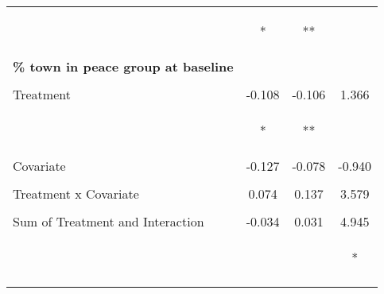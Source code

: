 \begin{tabular}{lccc}
 & \begin{footnotesize}[0.124]*\end{footnotesize} & \begin{footnotesize}[0.108]**\end{footnotesize} & \begin{footnotesize}[4.160]\end{footnotesize}\\
\noalign{\smallskip}\textbf{\% town in peace group at baseline} &  &  & \\
 & \begin{footnotesize}\end{footnotesize} & \begin{footnotesize}\end{footnotesize} & \begin{footnotesize}\end{footnotesize}\\
\noalign{\smallskip}Treatment & -0.108 & -0.106 & 1.366\\
 & \begin{footnotesize}[0.061]*\end{footnotesize} & \begin{footnotesize}[0.049]**\end{footnotesize} & \begin{footnotesize}[1.988]\end{footnotesize}\\
\noalign{\smallskip}Covariate & -0.127 & -0.078 & -0.940\\
 & \begin{footnotesize}[0.110]\end{footnotesize} & \begin{footnotesize}[0.085]\end{footnotesize} & \begin{footnotesize}[3.518]\end{footnotesize}\\
\noalign{\smallskip}Treatment x Covariate & 0.074 & 0.137 & 3.579\\
 & \begin{footnotesize}[0.142]\end{footnotesize} & \begin{footnotesize}[0.112]\end{footnotesize} & \begin{footnotesize}[4.514]\end{footnotesize}\\
\noalign{\smallskip}Sum of Treatment and Interaction & -0.034 & 0.031 & 4.945\\
 & \begin{footnotesize}[0.094]\end{footnotesize} & \begin{footnotesize}[0.076]\end{footnotesize} & \begin{footnotesize}[2.934]*\end{footnotesize}\\
\noalign{\smallskip}\hline\end{tabular}

